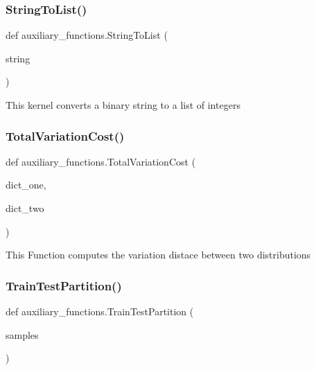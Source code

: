 \subsubsection{\texorpdfstring{String\+To\+List()}{StringToList()}}
{\footnotesize\ttfamily def auxiliary\+\_\+functions.\+String\+To\+List (\begin{DoxyParamCaption}\item[{}]{string }\end{DoxyParamCaption})}

\begin{DoxyVerb}This kernel converts a binary string to a list of integers\end{DoxyVerb}
 \mbox{\label{namespaceauxiliary__functions_ac81c85ec5da8c152fd9c646f85ecc0bf}} 
\subsubsection{\texorpdfstring{Total\+Variation\+Cost()}{TotalVariationCost()}}
{\footnotesize\ttfamily def auxiliary\+\_\+functions.\+Total\+Variation\+Cost (\begin{DoxyParamCaption}\item[{}]{dict\+\_\+one,  }\item[{}]{dict\+\_\+two }\end{DoxyParamCaption})}

\begin{DoxyVerb}This Function computes the variation distace between two distributions\end{DoxyVerb}
 \mbox{\label{namespaceauxiliary__functions_a4f7400968718917f204b573f72a0a883}} 
\subsubsection{\texorpdfstring{Train\+Test\+Partition()}{TrainTestPartition()}}
{\footnotesize\ttfamily def auxiliary\+\_\+functions.\+Train\+Test\+Partition (\begin{DoxyParamCaption}\item[{}]{samples }\end{DoxyParamCaption})}



